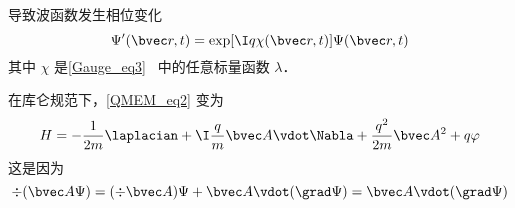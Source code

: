 导致波函数发生相位变化
\begin{equation}\label{QMEM_eq3}
\Psi'(\bvec r, t) = \exp[\I q\chi(\bvec r, t)] \Psi(\bvec r, t)
\end{equation}
其中 $\chi$ 是\autoref{Gauge_eq3}~ 中的任意标量函数 $\lambda$．

在库仑规范下，\autoref{QMEM_eq2} 变为
\begin{equation}\label{QMEM_eq4}
H = -\frac{1}{2m} \laplacian + \I \frac{q}{m} \bvec A \vdot \Nabla + \frac{q^2}{2m} \bvec A^2 + q\varphi
\end{equation}
这是因为
\begin{equation}
\div (\bvec A \Psi) = (\div \bvec A) \Psi + \bvec A \vdot (\grad \Psi) = \bvec A \vdot (\grad \Psi)
\end{equation}

